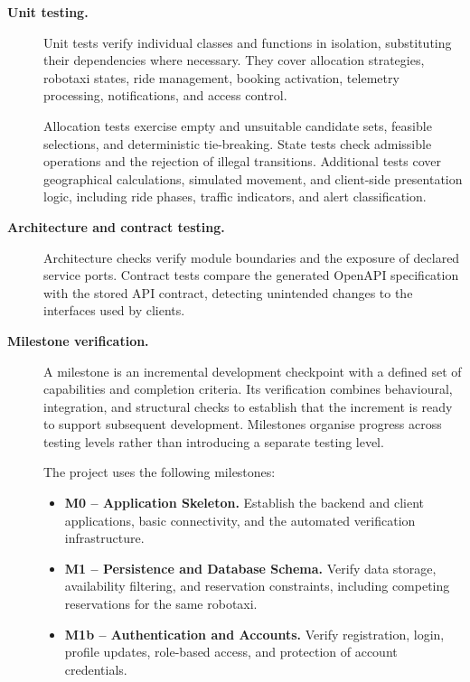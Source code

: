 \documentclass[11pt,a4paper,oneside]{report}
\begin{document}
\begin{description}

    \item[\textbf{Unit testing.}]
    Unit tests verify individual classes and functions in isolation,
    substituting their dependencies where necessary. They cover
    allocation strategies, robotaxi states, ride management, booking
    activation, telemetry processing, notifications, and access control.

    Allocation tests exercise empty and unsuitable candidate sets,
    feasible selections, and deterministic tie-breaking. State tests
    check admissible operations and the rejection of illegal
    transitions. Additional tests cover geographical calculations,
    simulated movement, and client-side presentation logic, including
    ride phases, traffic indicators, and alert classification.

\item[\textbf{Architecture and contract testing.}]
    Architecture checks verify module boundaries and the exposure of
    declared service ports. Contract tests compare the generated
    OpenAPI specification with the stored API contract, detecting
    unintended changes to the interfaces used by clients.

    \item[\textbf{Milestone verification.}]
    A milestone is an incremental development checkpoint with a
    defined set of capabilities and completion criteria. Its
    verification combines behavioural, integration, and structural
    checks to establish that the increment is ready to support
    subsequent development. Milestones organise progress across
    testing levels rather than introducing a separate testing level.

    The project uses the following milestones:

    \begin{itemize}
        \item \textbf{M0 -- Application Skeleton.}
        Establish the backend and client applications, basic
        connectivity, and the automated verification infrastructure.

        \item \textbf{M1 -- Persistence and Database Schema.}
        Verify data storage, availability filtering, and reservation
        constraints, including competing reservations for the same
        robotaxi.

        \item \textbf{M1b -- Authentication and Accounts.}
        Verify registration, login, profile updates, role-based access,
        and protection of account credentials.


\end{itemize}
\end{description}
\end{document}
